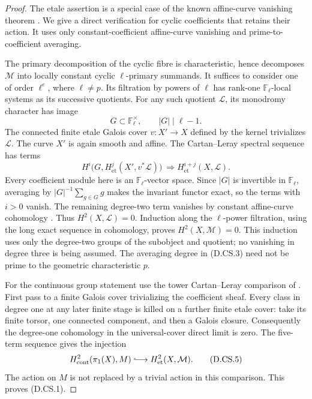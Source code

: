 \begin{proof}
The etale assertion is a special case of the known
affine-curve vanishing theorem
\citep[Proposition 14.12, with the preceding
prime-to-characteristic coefficient convention]
{MilneLEC2013H2D}. We give a direct verification for
cyclic coefficients that retains their action.
It uses only constant-coefficient affine-curve
vanishing and prime-to-coefficient averaging.

The primary decomposition of the cyclic fibre is
characteristic, hence decomposes \(\mathcal M\) into
locally constant cyclic \(\ell\)-primary summands.
It suffices to consider one of order \(\ell^e\),
where \(\ell\ne p\). Its filtration by powers of
\(\ell\) has rank-one \(\mathbb F_\ell\)-local systems
as its successive quotients. For any such quotient
\(\mathcal L\), its monodromy character has image
\[
       G\subset\mathbb F_\ell^\times,\qquad
                       |G|\mid\ell-1.                 \tag{D.CS.3}
\]
The connected finite etale Galois cover \(v:X'\to X\)
defined by the kernel trivializes \(\mathcal L\).
The curve \(X'\) is again smooth and affine.
The Cartan--Leray spectral sequence
\citep[Theorem 14.9 and its complete written proof]
{MilneLEC2013H2D} has terms
\[
 H^i\bigl(G,H^j_{\mathrm{et}}(X',v^*\mathcal L)\bigr)
                 \ \Longrightarrow
 H^{i+j}_{\mathrm{et}}(X,\mathcal L).                 \tag{D.CS.4}
\]
Every coefficient module here is an
\(\mathbb F_\ell\)-vector space. Since \(|G|\) is
invertible in \(\mathbb F_\ell\), averaging by
\(|G|^{-1}\sum_{g\in G}g\) makes the invariant
functor exact, so the terms with \(i>0\) vanish.
The remaining degree-two term vanishes by constant
affine-curve cohomology
\citep[Lemma 59.69.3, Tag 03RR, complete written proof]
{StacksCurveFixedLocalD}. Thus \(H^2(X,\mathcal L)=0\).
Induction along the \(\ell\)-power filtration, using
the long exact sequence in cohomology, proves
\(H^2(X,\mathcal M)=0\). This induction uses only
the degree-two groups of the subobject and quotient;
no vanishing in degree three is being assumed.
The averaging degree in (D.CS.3) need not be prime
to the geometric characteristic \(p\).

For the continuous group statement use the tower
Cartan--Leray comparison of
\citet[Theorem 14.9 and Remark 14.10]{MilneLEC2013H2D}.
First pass to a finite Galois cover trivializing the
coefficient sheaf. Every class in degree one at any
later finite stage is killed on a further finite
etale cover: take its finite torsor, one connected
component, and then a Galois closure. Consequently
the degree-one cohomology in the universal-cover
direct limit is zero. The five-term sequence gives
the injection
\[
 H^2_{\mathrm{cont}}(\pi_1(X),M)
       \lhook\joinrel\longrightarrow
 H^2_{\mathrm{et}}(X,\mathcal M).                      \tag{D.CS.5}
\]
The action on \(M\) is not replaced by a trivial
action in this comparison. This proves (D.CS.1).


\end{proof}
